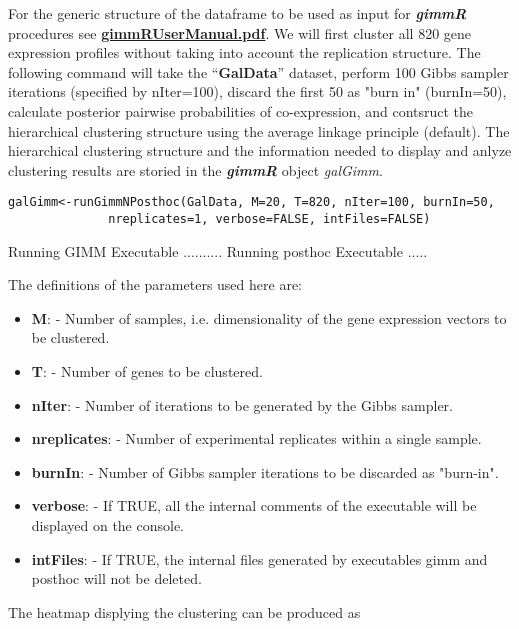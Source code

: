 \documentclass[12pt]{article}
\begin{document}
For the generic structure of the dataframe to be used as input for \textbf{\textit{gimmR}} procedures see \underline{\textbf{gimmRUserManual.pdf}}.  We will first cluster all 820 gene expression profiles without taking into account the replication structure.  The following command will take the ``\textbf{GalData}'' dataset, perform 100 Gibbs sampler iterations (specified by nIter=100), discard the first 50 as "burn in" (burnIn=50), calculate posterior pairwise probabilities of co-expression, and contsruct the hierarchical clustering structure using the average linkage principle (default). The hierarchical clustering structure and the information needed to display and anlyze clustering results are storied in the \textbf{\textit{gimmR}} object \textit{galGimm}. 

\begin{verbatim}
galGimm<-runGimmNPosthoc(GalData, M=20, T=820, nIter=100, burnIn=50, 
              nreplicates=1, verbose=FALSE, intFiles=FALSE)
\end{verbatim}

\begin{Schunk}
\begin{Soutput}
Running GIMM Executable ..........
Running posthoc Executable ..... 
\end{Soutput}
\end{Schunk}

The definitions of the parameters used here are:

\begin{itemize}
\item \textbf{M}: - Number of samples, i.e. dimensionality of the gene expression vectors to be clustered.
\item \textbf{T}: - Number of genes to be clustered.
\item \textbf{nIter}: - Number of iterations to be generated by the Gibbs sampler.
\item \textbf{nreplicates}: - Number of experimental replicates within a single sample.
\item \textbf{burnIn}: - Number of Gibbs sampler iterations to be discarded as "burn-in".
\item \textbf{verbose}: - If TRUE, all the internal comments of the executable will be displayed on the console.
\item \textbf{intFiles}: - If TRUE, the internal files generated by executables gimm and posthoc will not be deleted.
\end{itemize}

The heatmap displying the clustering can be produced as
\end{document}
